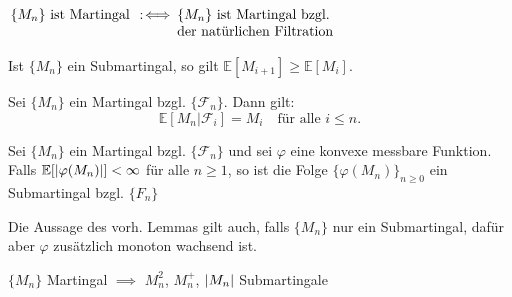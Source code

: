 \documentclass{cheat-sheet}
\newcommand{\E}{\mathbb{E}} %
\newcommand{\Filt}{\mathcal{F}} %
\begin{document}

\begin{defn}
  $
    \arraycolsep=1pt
    \begin{array}[t]{r c l}
      \{ M_n \} \text{ ist Martingal} & \coloniff & \{ M_n \} \text{ ist Martingal bzgl.} \\
      && \text{der natürlichen Filtration}
    \end{array}
  $
\end{defn}

\begin{lem}
  Ist $\{ M_n \}$ ein Submartingal, so gilt $\E[ M_{i+1} ] \geq \E[M_i]$.
\end{lem}

\begin{lem}
  Sei $\{ M_n \}$ ein Martingal bzgl. $\{ \Filt_n \}$.
  Dann gilt:
  \[
    \E[M_n | \Filt_i] = M_i
    \quad \text{für alle $i \leq n$.}
  \]
\end{lem}

\begin{lem}
  Sei $\{ M_n \}$ ein Martingal bzgl. $\{ \Filt_n \}$ und sei $\varphi$ eine konvexe messbare Funktion.
  Falls $\E [\abs{\varphi(M_n)}] < \infty$ für alle $n \geq 1$, so ist die Folge $\{ \varphi(M_n) \}_{n \geq 0}$ ein Submartingal bzgl. $\{ F_n \}$
\end{lem}

\begin{bem}
  Die Aussage des vorh. Lemmas gilt auch, falls $\{ M_n \}$ nur ein Submartingal, dafür aber $\varphi$ zusätzlich monoton wachsend ist.
\end{bem}

\begin{bsp}
  $\{ M_n \}$ Martingal $\implies$ $M_n^2$, $M_n^{+}$, $\lvert M_n\rvert$ Submartingale
\end{bsp}
\end{document}
